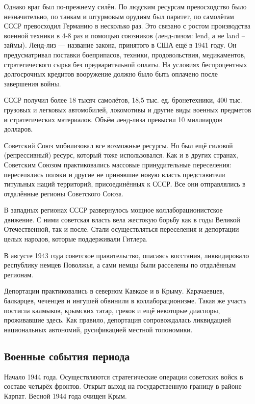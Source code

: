 \documentclass{article}
\begin{document}
Однако враг был по-прежнему силён. По людским ресурсам превосходство было незначительно, по танкам и штурмовым орудиям был паритет, по самолётам СССР превосходил Германию в несколько раз. Это связано с ростом производства военной техники в 4-8 раз и помощью союзников (ленд-лизом: lend, а не land -- займы). Ленд-лиз --- название закона, принятого в США ещё в 1941 году. Он предусматривал поставки боеприпасов, техники, продовольствия, медикаментов, стратегического сырья без предварительной оплаты. На условиях беспроцентных долгосрочных кредитов вооружение должно было быть оплачено после завершения войны.

СССР получил более 18 тысяч самолётов, 18,5 тыс. ед. бронетехники, 400 тыс. грузовых и легковых автомобилей, локомотивы и другие виды военных предметов и стратегических материалов. Объём ленд-лиза превысил 10 миллиардов долларов.

Советский Союз мобилизовал все возможные ресурсы. Но был ещё силовой (репрессивный) ресурс, который тоже использовался. Как и в других странах, Советским Союзом практиковались массовые принудительные переселения: переселялись поляки и другие не принявшие новую власть представители титульных наций территорий, присоединённых к СССР. Все они отправлялись в отдалённые регионы Советского Союза.

В западных регионах СССР развернулось мощное коллаборационистское движение. С ними советская власть вела жестокую борьбу как в годы Великой Отечественной, так и после. Стали осуществляться переселения и депортации целых народов, которые поддерживали Гитлера.

В августе 1943 года советское правительство, опасаясь восстания, ликвидировало республику немцев Поволжья, а сами немцы были расселены по отдалённым регионам.

Депортации практиковались в северном Кавказе и в Крыму. Карачаевцев, балкарцев, чеченцев и ингушей обвинили в коллаборационизме. Такая же участь постигла калмыков, крымских татар, греков и ещё некоторые диаспоры, проживавшие здесь. Как правило, депортация сопровождалась ликвидацией национальных автономий, русификацией местной топономики.

\subsection{Военные события периода}

Начало 1944 года. Осуществляются стратегические операции советских войск в составе четырёх фронтов. Открыт выход на государственную границу в районе Карпат. Весной 1944 года очищен Крым.
\end{document}
